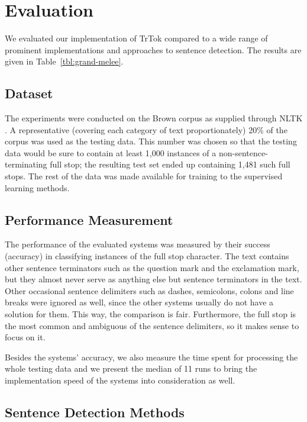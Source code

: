 \section{Evaluation}
\label{sec:eval}

We evaluated our implementation of TrTok compared to a wide range of
prominent implementations and approaches to sentence detection. The
results are given in Table~\ref{tbl:grand-melee}.

\subsection{Dataset}

The experiments were conducted on the Brown corpus \cite{data-brown}
as supplied through NLTK \cite{software-nltk}. A representative
(covering each category of text proportionately) 20\% of the corpus
was used as the testing data. This number was chosen so that the
testing data would be sure to contain at least 1,000 instances of a
non-sentence-terminating full stop; the resulting test set ended up
containing 1,481 such full stops. The rest of the data was made
available for training to the supervised learning methods.

\subsection{Performance Measurement}

The performance of the evaluated systems was measured by their success
(accuracy) in classifying instances of the full stop character. The
text contains other sentence terminators such as the question mark and
the exclamation mark, but they almost never serve as anything else but
sentence terminators in the text. Other occasional sentence delimiters
such as dashes, semicolons, colons and line breaks were ignored as
well, since the other systems usually do not have a solution for them.
This way, the comparison is fair. Furthermore, the full stop is the
most common and ambiguous of the sentence delimiters, so it makes
sense to focus on it.

Besides the systems' accuracy, we also measure the time spent for
processing the whole testing data and we present the median of 11 runs
to bring the implementation speed of the systems into consideration as
well.

\subsection{Sentence Detection Methods}

